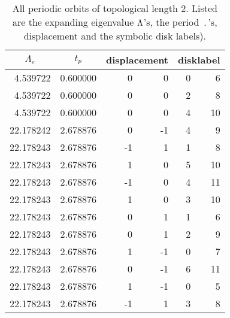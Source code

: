 \begin{table}
\centering
\caption[]{ All periodic orbits of topological length 2. Listed are the expanding eigenvalue $\Lambda$'s, the period $\period{}$'s, displacement
and the symbolic disk labels).
  }
    \begin{tabular}{|r|r|rr|rr|}
    \hline
    \multicolumn{1}{|c|}{$\Lambda_e$} & \multicolumn{1}{c|}{$t_p$}    & \multicolumn{2}{|c|}{displacement} & \multicolumn{2}{|c|}{disklabel} \\
    \hline
    4.539722 & 0.600000 & 0     & 0     & 0     & 6 \\
    4.539722 & 0.600000 & 0     & 0     & 2     & 8 \\
    4.539722 & 0.600000 & 0     & 0     & 4     & 10 \\
    22.178242 & 2.678876 & 0     & -1    & 4     & 9 \\
    22.178243 & 2.678876 & -1    & 1     & 1     & 8 \\
    22.178243 & 2.678876 & 1     & 0     & 5     & 10 \\
    22.178243 & 2.678876 & -1    & 0     & 4     & 11 \\
    22.178243 & 2.678876 & 1     & 0     & 3     & 10 \\
    22.178243 & 2.678876 & 0     & 1     & 1     & 6 \\
    22.178243 & 2.678876 & 0     & 1     & 2     & 9 \\
    22.178243 & 2.678876 & 1     & -1    & 0     & 7 \\
    22.178243 & 2.678876 & 0     & -1    & 6     & 11 \\
    22.178243 & 2.678876 & 1     & -1    & 0     & 5 \\
    22.178243 & 2.678876 & -1    & 1     & 3     & 8 \\

\end{tabular}
\end{table}
